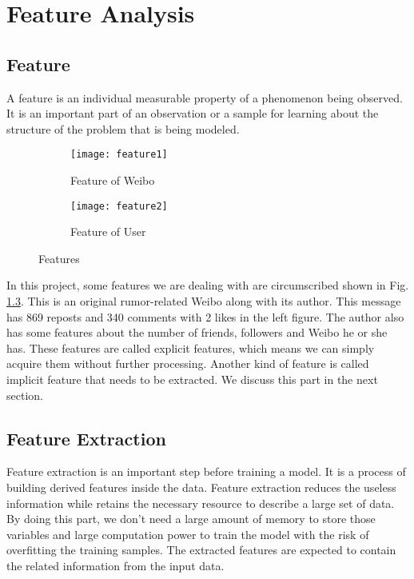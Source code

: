 \iffalse

\fi

\chapter{Feature Analysis}
\section{Feature}
A feature is an individual measurable property of a phenomenon being observed\cite{bishop2006pattern}. It is an important part of an observation or a sample for learning about the structure of the problem that is being modeled.
\begin{figure}[h]\centering 
\begin{subfigure}[b]{0.4\textwidth} \texttt{[image: feature1]} \caption{Feature of Weibo} \label{fig:Weibo} \end{subfigure} \qquad \qquad
\begin{subfigure}[b]{0.4\textwidth} \texttt{[image: feature2]} \caption{Feature of User} \label{fig:User} \end{subfigure}
\caption{Features}\label{fig:features} \end{figure}

In this project, some features we are dealing with are circumscribed shown in Fig. \ref{fig:features}. This is an original rumor-related Weibo along with its author. This message has 869 reposts and 340 comments with 2 likes in the left figure. The author also has some features about the number of friends, followers and Weibo he or she has. These features are called explicit features, which means we can simply acquire them without further processing. Another kind of feature is called implicit feature that needs to be extracted. We discuss this part in the next section.

\section{Feature Extraction}
Feature extraction is an important step before training a model. It is a process of building derived features inside the data. Feature extraction reduces the useless information while retains the necessary resource to describe a large set of data. By doing this part, we don't need a large amount of memory to store those variables and large computation power to train the model with the risk of overfitting the training samples. The extracted features are expected to contain the related information from the input data.

